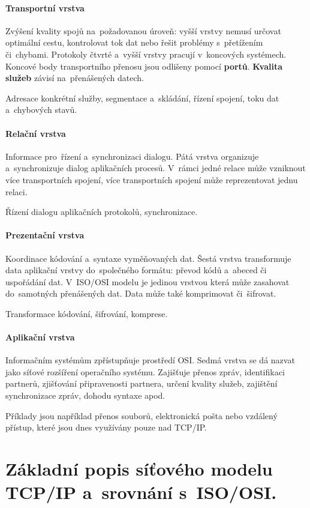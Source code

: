 \paragraph{Transportní vrstva} Zvýšení kvality spojů na~požadovanou úroveň: vyšší vrstvy nemusí určovat optimální cestu, kontrolovat tok dat nebo řešit problémy s~přetížením či~chybami. Protokoly čtvrté a~vyšší vrstvy pracují v~koncových systémech. Koncové body transportního přenosu jsou odlišeny pomocí \textbf{portů}. \textbf{Kvalita služeb} závisí na~přenášených datech.

Adresace konkrétní služby, segmentace a~skládání, řízení spojení, toku dat a~chybových stavů.

\paragraph{Relační vrstva} Informace pro~řízení a~synchronizaci dialogu. Pátá vrstva organizuje a~synchronizuje dialog aplikačních procesů. V~rámci jedné relace může vzniknout více transportních spojení, více transportních spojení může reprezentovat jednu relaci.

Řízení dialogu aplikačních protokolů, synchronizace.

\paragraph{Prezentační vrstva} Koordinace kódování a~syntaxe vyměňovaných dat. Šestá vrstva transformuje data aplikační vrstvy do~společného formátu: převod kódů a~abeced či uspořádání dat. V~ISO/OSI modelu je jedinou vrstvou která může zasahovat do~samotných přenášených dat. Data může také komprimovat či~šifrovat.

Transformace kódování, šifrování, komprese.

\paragraph{Aplikační vrstva} Informačním systémům zpřístupňuje prostředí OSI. Sedmá vrstva se dá nazvat jako síťové rozšíření operačního systému. Zajišťuje přenos zpráv, identifikaci partnerů, zjišťování připravenosti partnera, určení kvality služeb, zajištění synchronizace zpráv, dohodu syntaxe apod.

Příklady jsou například přenos souborů, elektronická pošta nebo vzdálený přístup, které jsou dnes využívány pouze nad TCP/IP.

\clearpage
\section{Základní popis síťového modelu TCP/IP a~srovnání s~ISO/OSI.}

